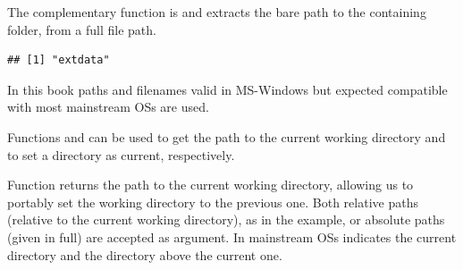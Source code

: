 \documentclass[krantz2]{krantz}\usepackage{knitr}%
\begin{document}
The complementary function is  and extracts the bare path to the containing folder, from a full file path.
\begin{knitrout}\footnotesize
{}\color{fgcolor}\begin{kframe}
\begin{alltt}
\hlstd{(}\hlstd{)}
\end{alltt}
\begin{verbatim}
## [1] "extdata"
\end{verbatim}
\end{kframe}
\end{knitrout}

\begin{warningbox}
In this book paths and filenames valid in MS-Windows but expected compatible with most mainstream OSs are used.
\end{warningbox}

Functions  and  can be used to get the path to the current working directory and to set a directory as current, respectively.
\begin{knitrout}\footnotesize
{}\color{fgcolor}\begin{kframe}
\begin{alltt}
\hlstd{()}
\end{alltt}
\end{kframe}
\end{knitrout}

Function  returns the path to the current working directory, allowing us to portably set the working directory to the previous one. Both relative paths (relative to the current working directory), as in the example, or absolute paths (given in full) are accepted as argument. In mainstream OSs  indicates the current directory and  the directory above the current one.
\begin{knitrout}\footnotesize
{}\color{fgcolor}\begin{kframe}
\begin{alltt}
 \hlkwb{<-} \hlstd{(}\hlstd{)}
\hlstd{()}
\end{alltt}
\end{kframe}
\end{knitrout}
\end{document}
